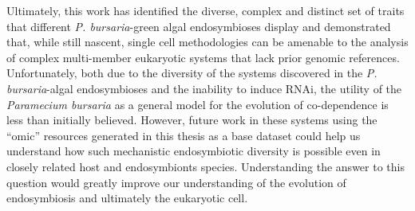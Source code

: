 Ultimately, this work has identified the diverse, complex and distinct set
of traits that different \textit{P. bursaria}-green algal endosymbioses
display and demonstrated that, while still nascent, single cell methodologies
can be amenable to the analysis of complex multi-member eukaryotic
systems that lack prior genomic references.  Unfortunately, both due to the
diversity of the systems discovered in the \textit{P. bursaria}-algal endosymbioses
and the inability to induce RNAi, the 
utility of the \textit{Paramecium bursaria} as a general model for
the evolution of co-dependence is less than initially believed.  
However, future work in these systems using the ``omic'' resources generated in 
this thesis as a base dataset could help us understand how such mechanistic
endosymbiotic diversity is possible even in closely
related host and endosymbionts species. Understanding the answer to this
question would greatly improve our understanding of the evolution of endosymbiosis
and ultimately the eukaryotic cell.
